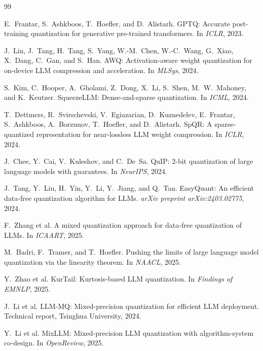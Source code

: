 \documentclass{article}
\begin{document}
\begin{thebibliography}{99}

E.~Frantar, S.~Ashkboos, T.~Hoefler, and D.~Alistarh.
\newblock GPTQ: Accurate post-training quantization for generative pre-trained transformers.
\newblock In \emph{ICLR}, 2023.

J.~Lin, J.~Tang, H.~Tang, S.~Yang, W.-M.~Chen, W.-C.~Wang, G.~Xiao, X.~Dang, C.~Gan, and S.~Han.
\newblock AWQ: Activation-aware weight quantization for on-device LLM compression and acceleration.
\newblock In \emph{MLSys}, 2024.

S.~Kim, C.~Hooper, A.~Gholami, Z.~Dong, X.~Li, S.~Shen, M.~W.~Mahoney, and K.~Keutzer.
\newblock SqueezeLLM: Dense-and-sparse quantization.
\newblock In \emph{ICML}, 2024.

T.~Dettmers, R.~Svirschevski, V.~Egiazarian, D.~Kuznedelev, E.~Frantar, S.~Ashkboos, A.~Borzunov, T.~Hoefler, and D.~Alistarh.
\newblock SpQR: A sparse-quantized representation for near-lossless LLM weight compression.
\newblock In \emph{ICLR}, 2024.

J.~Chee, Y.~Cai, V.~Kuleshov, and C.~De~Sa.
\newblock QuIP: 2-bit quantization of large language models with guarantees.
\newblock In \emph{NeurIPS}, 2024.

J.~Tang, Y.~Liu, H.~Yin, Y.~Li, Y.~Jiang, and Q.~Tan.
\newblock EasyQuant: An efficient data-free quantization algorithm for LLMs.
\newblock \emph{arXiv preprint arXiv:2403.02775}, 2024.

F.~Zhang et al.
\newblock A mixed quantization approach for data-free quantization of LLMs.
\newblock In \emph{ICAART}, 2025.

M.~Badri, F.~Tramer, and T.~Hoefler.
\newblock Pushing the limits of large language model quantization via the linearity theorem.
\newblock In \emph{NAACL}, 2025.

Y.~Zhao et al.
\newblock KurTail: Kurtosis-based LLM quantization.
\newblock In \emph{Findings of EMNLP}, 2025.

J.~Li et al.
\newblock LLM-MQ: Mixed-precision quantization for efficient LLM deployment.
\newblock Technical report, Tsinghua University, 2024.

Y.~Li et al.
\newblock MixLLM: Mixed-precision LLM quantization with algorithm-system co-design.
\newblock In \emph{OpenReview}, 2025.


\end{thebibliography}
\end{document}
